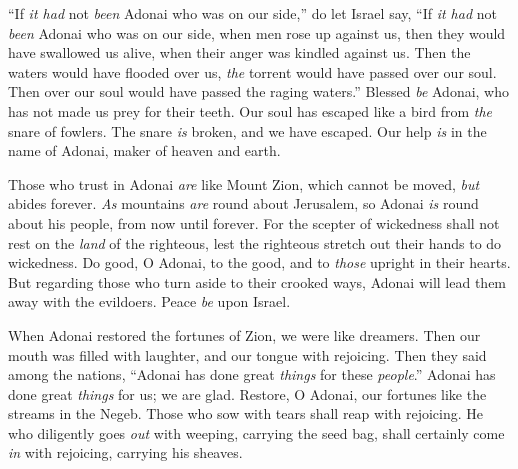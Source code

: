 \begin{biblechapter} %
 “If \textit{it had} not \textit{been} Adonai who was on our side,” 
do let Israel say,
\verse “If \textit{it had} not \textit{been} Adonai who was on our side, 
when men rose up against us,
\verse then they would have swallowed us alive, 
when their anger was kindled against us.
\verse Then the waters would have flooded over us, 
\textit{the} torrent would have passed over our soul.
\verse Then over our soul would have passed 
the raging waters.”
\verse Blessed \textit{be} Adonai, 
who has not made us prey for their teeth.
\verse Our soul has escaped like a bird 
from \textit{the} snare of fowlers. 
The snare \textit{is} broken, and we have escaped.
\verse Our help \textit{is} in the name of Adonai, 
maker of heaven and earth.
\end{biblechapter}

\begin{biblechapter} %
 Those who trust in Adonai 
\textit{are} like Mount Zion, which cannot be moved, 
\textit{but} abides forever.
\verse \textit{As} mountains \textit{are} round about Jerusalem, 
so Adonai \textit{is} round about his people, 
from now until forever.
\verse For the scepter of wickedness shall not rest 
on the \textit{land} of the righteous, 
lest the righteous stretch out 
their hands to do wickedness.
\verse Do good, O Adonai, to the good, 
and to \textit{those} upright in their hearts.
\verse But regarding those who turn aside to their crooked ways, 
Adonai will lead them away with the evildoers. 
Peace \textit{be} upon Israel.
\end{biblechapter}

\begin{biblechapter} %
 When Adonai restored the fortunes of Zion, 
we were like dreamers.
\verse Then our mouth was filled with laughter, 
and our tongue with rejoicing. 
Then they said among the nations, 
“Adonai has done great \textit{things} for these \textit{people}.”
\verse Adonai has done great \textit{things} for us; 
we are glad.
\verse Restore, O Adonai, our fortunes 
like the streams in the Negeb.
\verse Those who sow with tears 
shall reap with rejoicing.
\verse He who diligently goes \textit{out} with weeping, 
carrying the seed bag, 
shall certainly come \textit{in} with rejoicing, 
carrying his sheaves.
\end{biblechapter}


